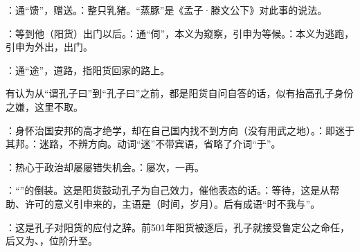{：通“馈”，赠送。：整只乳猪。“蒸豚”是《孟子·滕文公下》对此事的说法。%

\item {}：等到他（阳货）出门以后。：通“伺”，本义为窥察，引申为等候。：本义为逃跑，引申为外出，出门。

\item {}：通“途”，道路，指阳货回家的路上。

有认为从“谓孔子曰”到“孔子曰”之前，都是阳货自问自答的话，似有抬高孔子身份之嫌，这里不取。

\item {}：身怀治国安邦的高才绝学，却在自己国内找不到方向（没有用武之地）。：即迷于其邦。：迷路，不辨方向。动词“迷”不带宾语，省略了介词“于”。

\item {}：热心于政治却屡屡错失机会。：屡次，一再。
\item {}：“”的倒装。这是阳货鼓动孔子为自己效力，催他表态的话。：等待，这是从帮助、许可的意义引申来的，主语是（时间，岁月）。后有成语“时不我与”。
\item {}：这是孔子对阳货的应付之辞。前501年阳货被逐后，孔子就接受鲁定公之命任，后又为、，位阶升至。
}
{}  %


